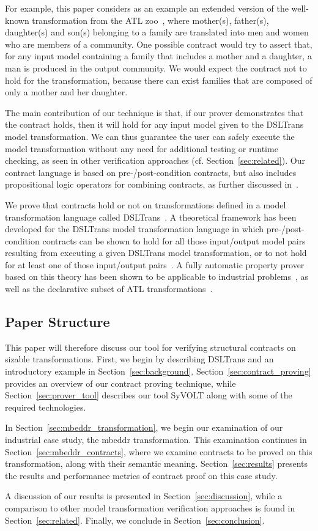 For example, this paper considers as an example an extended version of the well-known \FTP
transformation from the ATL zoo~\cite{atlZoo}, where mother(s), father(s),
daughter(s) and son(s) belonging to a family are translated into men and women
who are members of a community. One possible contract would try to assert that,
for any input model containing a family that includes a mother and a daughter,
a man is produced in the output community. We would expect the contract not to
hold for the \FTP transformation, because there can exist families that are composed of
only a mother and her daughter.

The main contribution of our technique is that, if
our prover demonstrates that the contract holds, then it will hold for any input
model given to the DSLTrans model transformation. We can thus guarantee the
user can safely execute the model transformation without any need for additional
testing or runtime checking, as seen in other verification approaches (cf. Section~\ref{sec:related}). Our contract language is based on pre-/post-condition contracts, but also includes propositional logic operators
for combining contracts, as further discussed in~\cite{Oakes2016}.


We prove that contracts hold or not on transformations defined in a model transformation language called
DSLTrans~\cite{Barroca2011}. A theoretical framework has been developed for
the DSLTrans model transformation language in which pre-/post-condition
contracts can be shown to hold for all those input/output model pairs resulting from executing a given
DSLTrans model transformation, or to not hold for at least one of those
input/output pairs~\cite{Lucio2014}. A fully automatic property prover based on
this theory has been shown to be applicable to industrial
problems~\cite{Selim2014}, as well as the declarative subset of ATL transformations~\cite{Oakes2016}.

\subsection{Paper Structure}

This paper will therefore discuss our tool for verifying structural contracts on sizable transformations. First, we begin by describing DSLTrans and an introductory example in Section~\ref{sec:background}. Section~\ref{sec:contract_proving} provides an overview of our contract proving technique, while Section~\ref{sec:prover_tool} describes our tool SyVOLT along with some of the required technologies.

In Section~\ref{sec:mbeddr_transformation}, we begin our examination of our industrial case study, the mbeddr transformation. This examination continues in Section~\ref{sec:mbeddr_contracts}, where we examine contracts to be proved on this transformation, along with their semantic meaning. Section~\ref{sec:results} presents the results and performance metrics of contract proof on this case study.

A discussion of our results is presented in Section~\ref{sec:discussion}, while a comparison to other model transformation verification approaches is found in Section~\ref{sec:related}. Finally, we conclude in Section~\ref{sec:conclusion}.